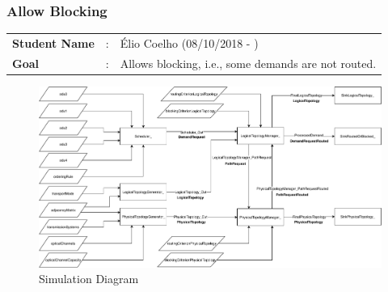 \subsubsection{Allow Blocking}

\begin{tcolorbox}	
	\begin{tabular}{p{2.75cm} p{0.2cm} p{10.5cm}} 	
		\textbf{Student Name}   &:& \'Elio Coelho    (08/10/2018 - )\\
		\textbf{Goal}           &:& Allows blocking, i.e., some demands are not routed.
	\end{tabular}
\end{tcolorbox}

\vspace{13pt}

\begin{figure}[H]
	\centering
	\includegraphics[width=16cm]{sdf/heuristic/opaque/figures/fluxogram}
	\caption{Simulation Diagram}
	\label{fluxogram}
\end{figure}

\newpage
\vspace{11pt}

